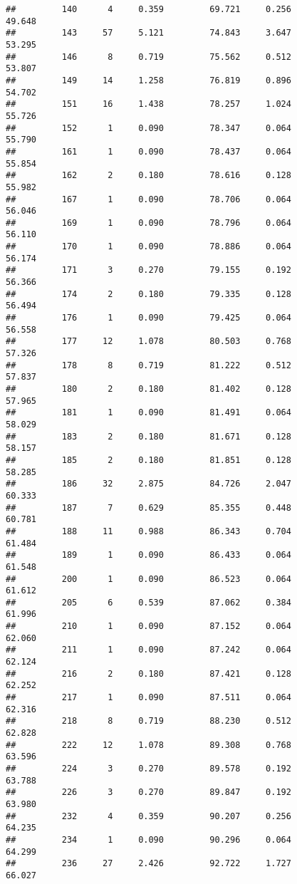 \documentclass[
]{article}
\begin{document}
\begin{verbatim}
##         140      4     0.359         69.721     0.256         49.648
##         143     57     5.121         74.843     3.647         53.295
##         146      8     0.719         75.562     0.512         53.807
##         149     14     1.258         76.819     0.896         54.702
##         151     16     1.438         78.257     1.024         55.726
##         152      1     0.090         78.347     0.064         55.790
##         161      1     0.090         78.437     0.064         55.854
##         162      2     0.180         78.616     0.128         55.982
##         167      1     0.090         78.706     0.064         56.046
##         169      1     0.090         78.796     0.064         56.110
##         170      1     0.090         78.886     0.064         56.174
##         171      3     0.270         79.155     0.192         56.366
##         174      2     0.180         79.335     0.128         56.494
##         176      1     0.090         79.425     0.064         56.558
##         177     12     1.078         80.503     0.768         57.326
##         178      8     0.719         81.222     0.512         57.837
##         180      2     0.180         81.402     0.128         57.965
##         181      1     0.090         81.491     0.064         58.029
##         183      2     0.180         81.671     0.128         58.157
##         185      2     0.180         81.851     0.128         58.285
##         186     32     2.875         84.726     2.047         60.333
##         187      7     0.629         85.355     0.448         60.781
##         188     11     0.988         86.343     0.704         61.484
##         189      1     0.090         86.433     0.064         61.548
##         200      1     0.090         86.523     0.064         61.612
##         205      6     0.539         87.062     0.384         61.996
##         210      1     0.090         87.152     0.064         62.060
##         211      1     0.090         87.242     0.064         62.124
##         216      2     0.180         87.421     0.128         62.252
##         217      1     0.090         87.511     0.064         62.316
##         218      8     0.719         88.230     0.512         62.828
##         222     12     1.078         89.308     0.768         63.596
##         224      3     0.270         89.578     0.192         63.788
##         226      3     0.270         89.847     0.192         63.980
##         232      4     0.359         90.207     0.256         64.235
##         234      1     0.090         90.296     0.064         64.299
##         236     27     2.426         92.722     1.727         66.027

\end{verbatim}
\end{document}
